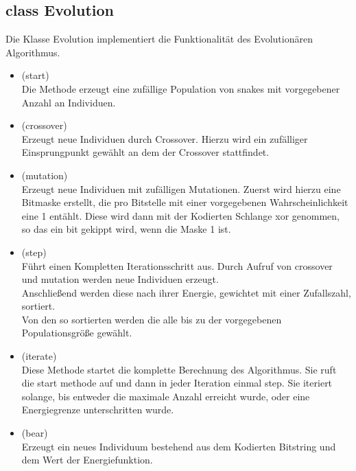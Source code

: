 \documentclass[a4paper,10pt,fleqn]{scrartcl}
\begin{document}
\subsection{class Evolution}
Die Klasse Evolution implementiert die Funktionalität des Evolutionären Algorithmus.
\begin{itemize}
\item (start)\\
Die Methode erzeugt eine zufällige Population von snakes mit vorgegebener Anzahl an Individuen.
\item (crossover)\\
Erzeugt neue Individuen durch Crossover. Hierzu wird ein zufälliger Einsprungpunkt gewählt an dem der Crossover stattfindet.
\item (mutation) \\
Erzeugt neue Individuen mit zufälligen Mutationen. Zuerst wird hierzu eine Bitmaske erstellt, die pro Bitstelle mit einer vorgegebenen Wahrscheinlichkeit eine 1 entählt. Diese wird dann mit der Kodierten Schlange xor genommen, so das ein bit gekippt wird, wenn die Maske 1 ist.
\item (step)\\
Führt einen Kompletten Iterationsschritt aus. Durch Aufruf von crossover und mutation werden neue Individuen erzeugt.\\ Anschließend werden diese nach ihrer Energie, gewichtet mit einer Zufallszahl, sortiert.\\
Von den so sortierten werden die alle bis zu der vorgegebenen Populationsgröße gewählt.
\item (iterate)\\
Diese Methode startet die komplette Berechnung des Algorithmus. Sie ruft die start methode auf und dann in jeder Iteration einmal step. Sie iteriert solange, bis entweder die maximale Anzahl erreicht wurde, oder eine Energiegrenze unterschritten wurde.
\item (bear)\\
Erzeugt ein neues Individuum bestehend aus dem Kodierten Bitstring und dem Wert der Energiefunktion.
\end{itemize}
\end{document}
